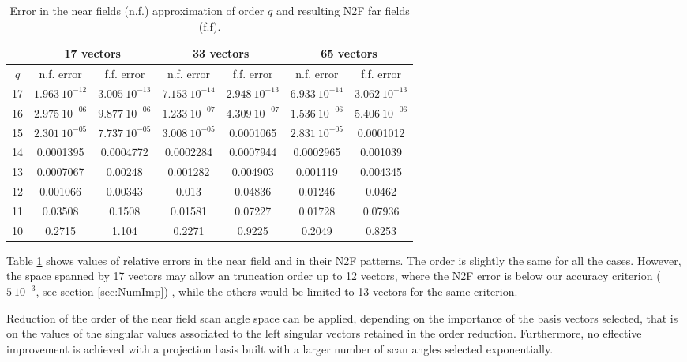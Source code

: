 \begin{table}[!tbp]
\centering
\small
\begin{tabular}{|c||c|c|c|c|c|c|}
\hline & \multicolumn{2}{c|}{17 vectors} & \multicolumn{2}{c|}{33 vectors}  & \multicolumn{2}{c|}{65 vectors} \\ \hline
\hline $q$ & n.f. error & f.f. error & n.f. error & f.f. error  & n.f. error & f.f. error  \\ \hline
\hline 17 & $1.963 \ 10^{-12}$ & $3.005 \ 10^{-13}$ & $7.153 \ 10^{-14}$ & $2.948 \ 10^{-13}$ & $6.933 \ 10^{-14}$ & $3.062 \ 10^{-13}$ \\
\hline 16 & $2.975 \ 10^{-06}$ & $9.877 \ 10^{-06}$ & $1.233 \ 10^{-07}$ & $4.309 \ 10^{-07}$ & $1.536 \ 10^{-06}$ & $5.406 \ 10^{-06}$ \\
\hline 15 & $2.301 \ 10^{-05}$ & $7.737 \ 10^{-05}$ & $3.008 \ 10^{-05}$ & 0.0001065 & $2.831 \ 10^{-05}$ & 0.0001012 \\
\hline 14 & 0.0001395 & 0.0004772 & 0.0002284 & 0.0007944 & 0.0002965 & 0.001039 \\
\hline 13 & 0.0007067 & 0.00248 & 0.001282 & 0.004903 & 0.001119 & 0.004345 \\
\hline 12 & 0.001066 & 0.00343 & 0.013 & 0.04836 & 0.01246 & 0.0462 \\
\hline 11 & 0.03508 & 0.1508 & 0.01581 & 0.07227 & 0.01728 & 0.07936 \\
\hline 10 & 0.2715 & 1.104 & 0.2271 & 0.9225 & 0.2049 & 0.8253 \\
\hline
\end{tabular}
\caption{Error in the near fields (n.f.) approximation of order $q$ and resulting N2F far fields (f.f).}
\label{tab:truncError}
\end{table} Table \ref{tab:truncError} shows values of relative errors in the near field and in their N2F patterns. The order is slightly the same for all the cases. However, the space spanned by 17 vectors may allow an truncation order up to 12 vectors, where the N2F error is below our accuracy criterion ($5 \ 10^{-3}$, see section \ref{sec:NumImp}) , while the others would be limited to 13 vectors for the same criterion.

\begin{mycc}
\label{cc:Truncation}
Reduction of the order of the near field scan angle space can be applied, depending on the importance of the basis vectors selected, that is on the values of the singular values associated to the left singular vectors retained in the order reduction. Furthermore, no effective improvement is achieved with a projection basis built with a larger number of scan angles selected exponentially.
\end{mycc}

